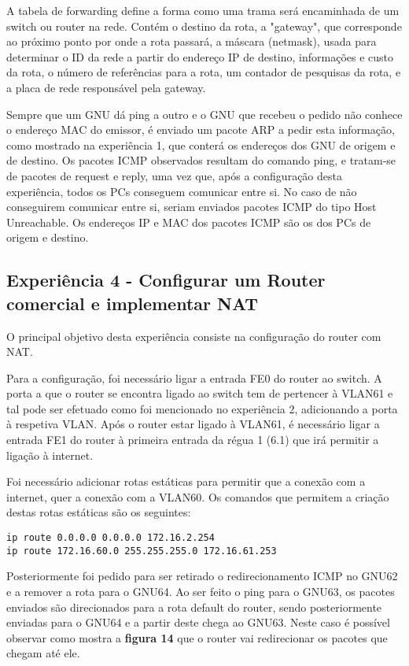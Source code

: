 \documentclass[article, a4paper, 11pt, oneside]{memoir}
\begin{document}
A tabela de forwarding define a forma como uma trama será encaminhada de um switch ou router na rede. Contém o destino da rota, a "gateway", que corresponde 
ao próximo ponto por onde a rota passará,
a máscara (netmask), usada para determinar o ID da rede a partir do endereço IP de destino, 
informações e custo da rota, o número de referências para a rota, 
um contador de pesquisas da rota, e a placa de rede responsável pela gateway.

Sempre que um GNU dá ping a outro e o GNU que recebeu o pedido não conhece o endereço MAC do emissor, é enviado um pacote ARP a pedir esta informação, 
como mostrado na experiência 1, que conterá os endereços dos GNU de origem e de destino.
Os pacotes ICMP observados resultam do comando ping, e tratam-se de pacotes de request e reply, uma vez que, após a configuração desta experiência, 
todos os PCs conseguem comunicar entre si.
No caso de não conseguirem comunicar entre si, seriam enviados pacotes ICMP do tipo Host Unreachable.
Os endereços IP e MAC dos pacotes ICMP são os dos PCs de origem e destino.

\subsection{Experiência 4 - Configurar um Router comercial e implementar NAT}

O principal objetivo desta experiência consiste na configuração do router com NAT.

Para a configuração, foi necessário ligar a entrada FE0 do router ao switch.
A porta a que o router se encontra ligado ao switch tem de pertencer à VLAN61 e tal pode ser efetuado como foi
mencionado no experiência 2, adicionando a porta à respetiva VLAN. Após o router estar ligado à VLAN61, 
é necessário ligar a entrada FE1 do router à primeira entrada da régua 1 (6.1) que irá permitir a ligação à internet.

Foi necessário adicionar rotas estáticas para permitir que a conexão com a internet, quer a conexão com a VLAN60.
Os comandos que permitem a criação destas rotas estáticas são os seguintes:

\begin{lstlisting} 
ip route 0.0.0.0 0.0.0.0 172.16.2.254
ip route 172.16.60.0 255.255.255.0 172.16.61.253
\end{lstlisting} 

Posteriormente foi pedido para ser retirado o redirecionamento ICMP no GNU62 e a remover a rota para o GNU64.
Ao ser feito o ping para o GNU63, os pacotes enviados são direcionados para a rota default do router, sendo posteriormente enviadas para o GNU64 e a partir deste
chega ao GNU63. Neste caso é possível observar como mostra a \textbf{figura 14} que o router vai redirecionar os pacotes que chegam até ele. 
\end{document}

